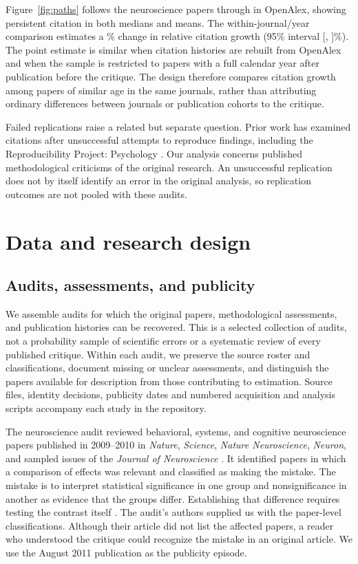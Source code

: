 \documentclass[11pt,letterpaper]{article}
\begin{document}
Figure~\ref{fig:paths} follows the neuroscience papers through \NwPathsLastYear{} in OpenAlex, showing persistent citation in both medians and means. The within-journal/year comparison estimates a \JcWosPercent\% change in relative citation growth (95\% interval [\JcWosLower, \JcWosUpper]\%). The point estimate is similar when citation histories are rebuilt from OpenAlex and when the sample is restricted to papers with a full calendar year after publication before the critique. The design therefore compares citation growth among papers of similar age in the same journals, rather than attributing ordinary differences between journals or publication cohorts to the critique.

Failed replications raise a related but separate question. Prior work has examined citations after unsuccessful attempts to reproduce findings, including the Reproducibility Project: Psychology \citep{osc2015,serragarcia2021,schafmeister2021,vonhippel2022,clark2023}. Our analysis concerns published methodological criticisms of the original research. An unsuccessful replication does not by itself identify an error in the original analysis, so replication outcomes are not pooled with these audits.

\section{Data and research design}
\subsection{Audits, assessments, and publicity}
We assemble audits for which the original papers, methodological assessments, and publication histories can be recovered. This is a selected collection of audits, not a probability sample of scientific errors or a systematic review of every published critique. Within each audit, we preserve the source roster and classifications, document missing or unclear assessments, and distinguish the papers available for description from those contributing to estimation. Source files, identity decisions, publicity dates and numbered acquisition and analysis scripts accompany each study in the repository.

The neuroscience audit reviewed behavioral, systems, and cognitive neuroscience papers published in 2009--2010 in \textit{Nature}, \textit{Science}, \textit{Nature Neuroscience}, \textit{Neuron}, and sampled issues of the \textit{Journal of Neuroscience} \citep{nieuwenhuis2011}. It identified \Classified{} papers in which a comparison of effects was relevant and classified \ClassifiedFlagged{} as making the mistake. The mistake is to interpret statistical significance in one group and nonsignificance in another as evidence that the groups differ. Establishing that difference requires testing the contrast itself \citep{gelman2006}. The audit's authors supplied us with the paper-level classifications. Although their article did not list the affected papers, a reader who understood the critique could recognize the mistake in an original article. We use the August 2011 publication as the publicity episode.
\end{document}
